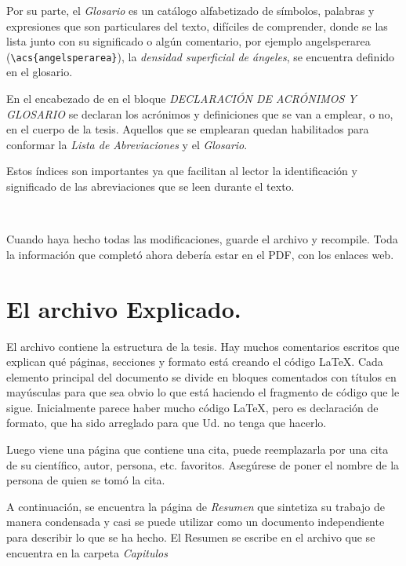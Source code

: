 Por su parte, el \emph{Glosario} es un catálogo alfabetizado de símbolos, palabras y expresiones que son particulares del texto, difíciles de comprender, donde se las lista junto con su significado o algún comentario, por ejemplo \acs{angelsperarea} (\verb*|\acs{angelsperarea}|), la \emph{densidad superficial de ángeles}, se encuentra definido en el glosario.

En el encabezado de  en el bloque \emph{DECLARACIÓN DE ACRÓNIMOS Y GLOSARIO} se declaran los acrónimos y definiciones que se van a emplear, o no, en el cuerpo de la tesis. Aquellos que se emplearan quedan habilitados para conformar la \emph{Lista de Abreviaciones} y el \emph{Glosario}. 

Estos índices son importantes ya que facilitan al lector la identificación y significado de las abreviaciones que se leen durante el texto. 

\

Cuando haya hecho todas las modificaciones, guarde el archivo y recompile. Toda la información que completó ahora debería estar en el PDF, con los enlaces web. 




\section{El archivo  Explicado.}

El archivo  contiene la estructura de la tesis. Hay muchos comentarios escritos que explican qué páginas, secciones y formato está creando el código \LaTeX{}. Cada elemento principal del documento se divide en bloques comentados con títulos en mayúsculas para que sea obvio lo que está haciendo el  fragmento de código que le sigue. Inicialmente parece haber mucho código \LaTeX{}, pero es declaración de  formato, que ha sido arreglado para que Ud. no tenga que hacerlo.

Luego viene una página que contiene una cita, puede reemplazarla por una cita de su científico, autor, persona, etc. favoritos. Asegúrese de poner el nombre de la persona de quien se tomó la cita.

A continuación, se encuentra la página de \emph{Resumen} que sintetiza su trabajo de manera condensada y casi se puede utilizar como un documento independiente para describir lo que se ha hecho. El Resumen se escribe en el archivo  que se encuentra en la carpeta \emph{Capitulos}


